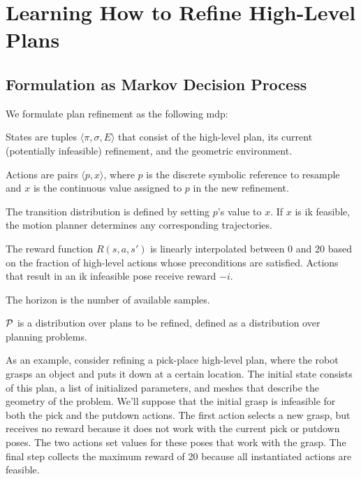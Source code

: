 \section{Learning How to Refine High-Level Plans}

\subsection{Formulation as Markov Decision Process}
We formulate plan refinement as the following {\sc mdp}:
\begin{tightlist}
\item States are tuples $\langle \pi, \sigma, E \rangle$ that consist of the
high-level plan, its current (potentially infeasible) refinement, and the
geometric environment.
\item Actions are pairs $\langle p, x \rangle$, where $p$ is the discrete symbolic
reference to resample and $x$ is the continuous value assigned to $p$ in the new refinement.
\item The transition distribution is defined by setting $p$'s value
  to $x$. If $x$ is {\sc ik} feasible, the motion planner determines
  any corresponding trajectories.
\item The reward function $R(s, a, s')$ is linearly interpolated
  between 0 and 20 based on the fraction of high-level actions whose
  preconditions are satisfied. Actions that result in an {\sc ik}
  infeasible pose receive reward $-i$.
\item The horizon is the number of available samples.
\item $\mathcal{P}$ is a distribution over plans to be refined, defined as a
  distribution over planning problems.
\end{tightlist}

As an example, consider refining a pick-place high-level plan, where the
robot grasps an object and puts it down at a certain location. The
initial state consists of this plan, a list of initialized parameters,
and meshes that describe the geometry of the problem. We'll suppose
that the initial grasp is infeasible for both the pick and the putdown
actions. The first action selects a new grasp, but receives no reward
because it does not work with the current pick or putdown poses. The
two actions set values for these poses that work with the grasp. The
final step collects the maximum reward of 20 because all instantiated
actions are feasible.

